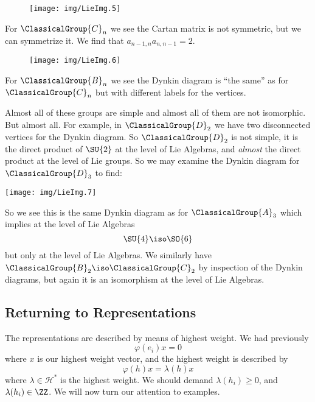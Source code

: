 \begin{wrapfigure}[2]{l}{4.5cm}
  \vspace{-20pt}
  \begin{center}
    \texttt{[image: img/LieImg.5]}
  \end{center}
  \vspace{-20pt}
\end{wrapfigure}
\noindent{}For $\ClassicalGroup{C}_{n}$ we see the Cartan
matrix is not symmetric, but we can symmetrize it. We find that
$a_{n-1,n}a_{n,n-1}=2$.

\begin{wrapfigure}[2]{r}{4.5cm}
  \vspace{-20pt}
  \begin{center}
    \texttt{[image: img/LieImg.6]}
  \end{center}
  \vspace{-20pt}
\end{wrapfigure}
\noindent{}For $\ClassicalGroup{B}_{n}$ we see the Dynkin diagram
is ``the same'' as for $\ClassicalGroup{C}_{n}$ but with
different labels for the vertices.

Almost all of these groups are simple and almost all of them are
not isomorphic. But almost all. For example, in
$\ClassicalGroup{D}_{2}$ we have two disconnected vertices for
the Dynkin diagram. So $\ClassicalGroup{D}_{2}$ is not simple, it
is the direct product of $\SU{2}$ at the level of Lie Algebras,
and \emph{almost} the direct product at the level of Lie
groups. So we may examine the Dynkin diagram for $\ClassicalGroup{D}_{3}$
to find:
\begin{center}
\texttt{[image: img/LieImg.7]}
\end{center}
\noindent{}So we see this is the same Dynkin diagram as for
$\ClassicalGroup{A}_{3}$ which implies at the level of Lie
Algebras
\begin{equation}
\SU{4}\iso\SO{6}
\end{equation}
but only at the level of Lie Algebras. We similarly have $\ClassicalGroup{B}_{2}\iso\ClassicalGroup{C}_{2}$
by inspection of the Dynkin diagrams, but again it is an
isomorphism at the level of Lie Algebras.



\subsection{Returning to Representations}
The representations are described by means of highest weight. We
had previously
\begin{equation}
\varphi(e_{i})x = 0
\end{equation}
where $x$ is our highest weight vector, and the highest weight is
described by
\begin{equation}
\varphi(h)x = \lambda(h)x
\end{equation}
where $\lambda\in\mathscr{H}^{*}$ is the highest weight. We
should demand $\lambda(h_{i})\geq0$, and
$\lambda(h_{i})\in\ZZ$. We will now turn our attention to examples.

